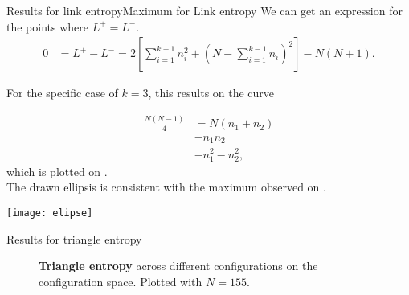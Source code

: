 \begin{frame}{Results for link entropy}{Maximum for Link entropy}
We can get an expression for the points where $L^{+}=L^{-}$.
\begin{align*}
     0 &= L^{+} - L^{-} =  2 \left[ \sum_{i=1}^{k-1} n_i^2 + \left( N-\sum_{i=1}^{k-1} n_i \right)^2   \right]   - N(N +  1) 
.\end{align*}
\begin{minipage}[c]{0.44\textwidth}
For the specific case of $k=3$, this results on the curve\\
	\strut\vspace*{-\baselineskip}\newline
	\begin{equation}
		\begin{aligned}
		    \frac{N \left(N - 1\right)}{4} &=  N \left(n_{1} + n_{2}\right) \\
			&- n_{1} n_{2} \\
			& - n_{1}^{2} - n_{2}^{2}, \label{eq:Lp_eq_Lm}
		\end{aligned}
	\end{equation}
	which is plotted on . \\

The drawn ellipsis is consistent with the maximum observed on .
\end{minipage}
\hspace{4mm}
\begin{minipage}[c]{0.47\textwidth}
\strut\vspace*{-\baselineskip}\newline
\begin{center}
	\vspace{-5mm}
	\texttt{[image: elipse]}
    \label{fig:Lp_eq_Lm}
\end{center}
\end{minipage}
\end{frame}

\begin{frame}{Results for triangle entropy}
\setlength\fboxsep{0pt}
\setlength\fboxrule{0pt}
\vspace{-2mm}
\begin{figure}[h]
 \centering
 \caption{\textbf{Triangle entropy} across different configurations on the configuration space. Plotted with $N=155.$}
 \label{fig:ps_sT}
\end{figure}
\end{frame}



